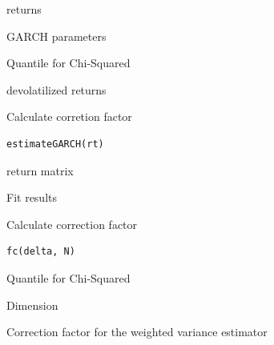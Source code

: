 \documentclass[letterpaper]{book}
\begin{document}
%
\begin{Arguments}
\begin{ldescription}
\item[\code{rt}] returns

\item[\code{eta\_df}] GARCH parameters

\item[\code{delta}] Quantile for Chi-Squared
\end{ldescription}
\end{Arguments}
%
\begin{Value}
devolatilized returns
\end{Value}
%
\begin{Description}
Calculate corretion factor
\end{Description}
%
\begin{Usage}
\begin{verbatim}
estimateGARCH(rt)
\end{verbatim}
\end{Usage}
%
\begin{Arguments}
\begin{ldescription}
\item[\code{rt}] return matrix
\end{ldescription}
\end{Arguments}
%
\begin{Value}
Fit results
\end{Value}
%
\begin{Description}
Calculate correction factor
\end{Description}
%
\begin{Usage}
\begin{verbatim}
fc(delta, N)
\end{verbatim}
\end{Usage}
%
\begin{Arguments}
\begin{ldescription}
\item[\code{delta}] Quantile for Chi-Squared

\item[\code{N}] Dimension
\end{ldescription}
\end{Arguments}
%
\begin{Value}
Correction factor for the weighted variance estimator
\end{Value}
\end{document}

